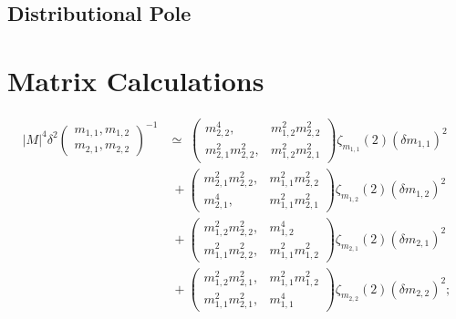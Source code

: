 \documentclass[twoside]{article}
\numberwithin{equation}{section}
\begin{document}
\subsection{Distributional Pole}

\section{Matrix Calculations}

\begin{align}
|M|^4 \delta^2 \left( \begin{matrix} m_{1,1}, m_{1,2} \\ m_{2,1}, m_{2,2} \end{matrix} \right)^{-1} &\simeq\; 
	 	\left( \begin{matrix} m_{2,2}^4, &m_{1,2}^2 m_{2,2}^2 \\ m_{2,1}^2 m_{2,2}^2, &m_{1,2}^2 m_{2,1}^2 \end{matrix} \right) \zeta_{m_{1,1}}(2) (\delta m_{1,1})^2 \nonumber \\
	 &\; +\left( \begin{matrix} m_{2,1}^2 m_{2,2}^2, &m_{1,1}^2 m_{2,2}^2 \\ m_{2,1}^4, &m_{1,1}^2 m_{2,1}^2 \end{matrix} \right)\zeta_{m_{1,2}}(2)  (\delta m_{1,2})^2\nonumber \\
	&\; + \left( \begin{matrix} m_{1,2}^2 m_{2,2}^2, &m_{1,2}^4 \\ m_{1,1}^2 m_{2,2}^2, &m_{1,1}^2 m_{1,2}^2 \end{matrix} \right) \zeta_{m_{2,1}}(2) (\delta m_{2,1})^2 \nonumber \\
	&\; +	\left( \begin{matrix} m_{1,2}^2 m_{2,1}^2, &m_{1,1}^2 m_{1,2}^2 \\ m_{1,1}^2 m_{2,1}^2, &m_{1,1}^4 \end{matrix} \right) \zeta_{m_{2,2}}(2) (\delta m_{2,2})^2
	; 
\label{eqn: inverse matrix 2 variance}
\end{align}
\end{document}
